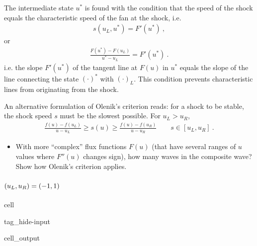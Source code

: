 \documentclass[letterpaper,10pt,english]{jupyterBook}
\begin{document}
\sphinxAtStartPar
The intermediate state \(u^*\) is found with the condition that the speed of the shock equals the characteristic speed of the fan at the shock, i.e.
\begin{equation*}
\begin{split}s(u_L, u^*) = F'(u^*) \ ,\end{split}
\end{equation*}
\sphinxAtStartPar
or
\begin{equation*}
\begin{split}\frac{F(u^*) - F(u_L)}{u^* - u_L} = F'(u^*) \ .\end{split}
\end{equation*}
\sphinxAtStartPar
i.e. the slope \(F'(u^*)\) of the tangent line at \(F(u)\) in \(u^*\) equals the slope of the line connecting the state \((\cdot)^*\) with \((\cdot)_L\). This condition prevents characteristic lines from originating from the shock.

\sphinxAtStartPar
An alternative formulation of Olenik’s criterion reads: for a shock to be stable, the shock speed \(s\) must be the slowest possible. For \(u_L > u_R\),
\begin{equation*}
\begin{split}\frac{f(u) - f(u_L)}{u - u_L} \ge s(u) \ge \frac{f(u) - f(u_R)}{u-u_R} \qquad s \in [ u_L, u_R ] \ .\end{split}
\end{equation*}
\sphinxAtStartPar
{}
\begin{itemize}
\item {} 
\sphinxAtStartPar
With more “complex” flux functions \(F(u)\) (that have several ranges of \(u\)\sphinxhyphen{}values where \(F''(u)\) changes sign), how many waves in the composite wave? Show how Olenik’s criterion applies.

\end{itemize}


\paragraph{\protect\((u_L, u_R) = (-1, 1)\protect\)}
\label{\detokenize{ch/pde/hyperbolic-non-convex:u-l-u-r-1-1}}
\begin{sphinxuseclass}{cell}
\begin{sphinxuseclass}{tag_hide-input}\begin{sphinxVerbatimOutput}

\begin{sphinxuseclass}{cell_output}
\noindent{}

\end{sphinxuseclass}\end{sphinxVerbatimOutput}

\end{sphinxuseclass}
\end{sphinxuseclass}
\end{document}
